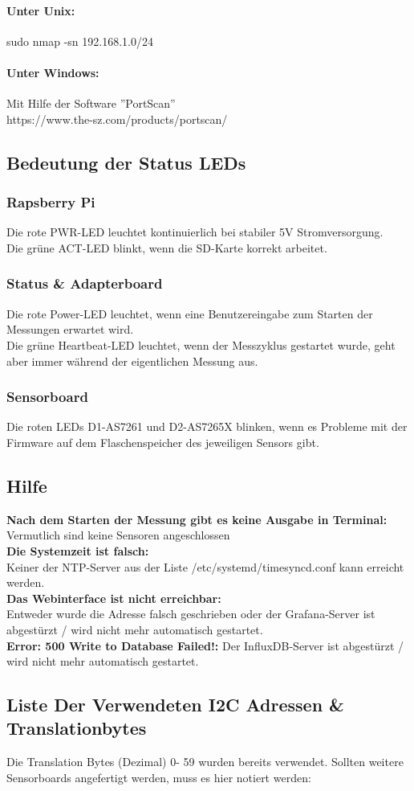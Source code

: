 \paragraph{Unter Unix:} sudo nmap -sn 192.168.1.0/24  
\paragraph{Unter Windows:} Mit Hilfe der Software ''PortScan'' \\https://www.the-sz.com/products/portscan/\smallskip

\subsection{Bedeutung der Status LEDs}\label{leds}
\subsubsection{Rapsberry Pi}
Die rote PWR-LED leuchtet kontinuierlich bei stabiler 5V Stromversorgung.\\
Die grüne ACT-LED blinkt, wenn die SD-Karte korrekt arbeitet.
\subsubsection{Status \& Adapterboard}
Die rote Power-LED leuchtet, wenn eine Benutzereingabe zum Starten der Messungen erwartet wird.\\
Die grüne Heartbeat-LED leuchtet, wenn der Messzyklus gestartet wurde, geht aber immer während der eigentlichen Messung aus.
\subsubsection{Sensorboard}
Die roten LEDs D1-AS7261 und D2-AS7265X blinken, wenn es Probleme mit der Firmware auf dem Flaschenspeicher des jeweiligen Sensors gibt.


\subsection{Hilfe}
\textbf{Nach dem Starten der Messung gibt es keine Ausgabe in Terminal:}\\
Vermutlich sind keine Sensoren angeschlossen\\
\textbf{Die Systemzeit ist falsch:}\\
Keiner der NTP-Server aus der Liste /etc/systemd/timesyncd.conf kann erreicht werden.\\
\textbf{Das Webinterface ist nicht erreichbar:}\\
Entweder wurde die Adresse falsch geschrieben oder der Grafana-Server ist abgestürzt / wird nicht mehr automatisch gestartet.\\
\textbf{Error: 500
Write to Database Failed!:}
Der InfluxDB-Server ist abgestürzt / wird nicht mehr automatisch gestartet.
\subsection{Liste Der Verwendeten I2C Adressen \& Translationbytes}
\label{liste_Translationbytes}
Die Translation Bytes (Dezimal) 0- 59 wurden bereits verwendet. Sollten weitere Sensorboards angefertigt werden, muss es hier notiert werden:






